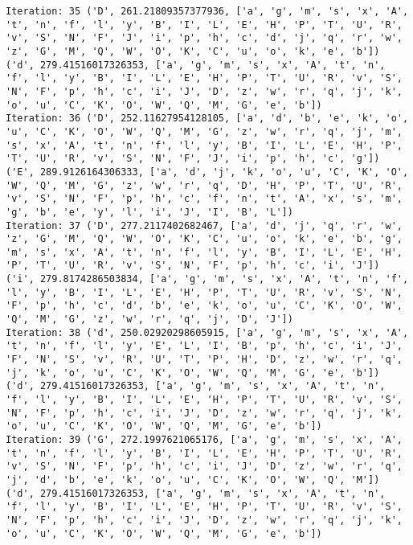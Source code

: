 \documentclass[english,man]{apa6}
\begin{document}
\begin{verbatim}
Iteration: 35 ('D', 261.21809357377936, ['a', 'g', 'm', 's', 'x', 'A', 't', 'n', 'f', 'l', 'y', 'B', 'I', 'L', 'E', 'H', 'P', 'T', 'U', 'R', 'v', 'S', 'N', 'F', 'J', 'i', 'p', 'h', 'c', 'd', 'j', 'q', 'r', 'w', 'z', 'G', 'M', 'Q', 'W', 'O', 'K', 'C', 'u', 'o', 'k', 'e', 'b']) ('d', 279.41516017326353, ['a', 'g', 'm', 's', 'x', 'A', 't', 'n', 'f', 'l', 'y', 'B', 'I', 'L', 'E', 'H', 'P', 'T', 'U', 'R', 'v', 'S', 'N', 'F', 'p', 'h', 'c', 'i', 'J', 'D', 'z', 'w', 'r', 'q', 'j', 'k', 'o', 'u', 'C', 'K', 'O', 'W', 'Q', 'M', 'G', 'e', 'b'])
Iteration: 36 ('D', 252.11627954128105, ['a', 'd', 'b', 'e', 'k', 'o', 'u', 'C', 'K', 'O', 'W', 'Q', 'M', 'G', 'z', 'w', 'r', 'q', 'j', 'm', 's', 'x', 'A', 't', 'n', 'f', 'l', 'y', 'B', 'I', 'L', 'E', 'H', 'P', 'T', 'U', 'R', 'v', 'S', 'N', 'F', 'J', 'i', 'p', 'h', 'c', 'g']) ('E', 289.9126164306333, ['a', 'd', 'j', 'k', 'o', 'u', 'C', 'K', 'O', 'W', 'Q', 'M', 'G', 'z', 'w', 'r', 'q', 'D', 'H', 'P', 'T', 'U', 'R', 'v', 'S', 'N', 'F', 'p', 'h', 'c', 'f', 'n', 't', 'A', 'x', 's', 'm', 'g', 'b', 'e', 'y', 'l', 'i', 'J', 'I', 'B', 'L'])
Iteration: 37 ('D', 277.2117402682467, ['a', 'd', 'j', 'q', 'r', 'w', 'z', 'G', 'M', 'Q', 'W', 'O', 'K', 'C', 'u', 'o', 'k', 'e', 'b', 'g', 'm', 's', 'x', 'A', 't', 'n', 'f', 'l', 'y', 'B', 'I', 'L', 'E', 'H', 'P', 'T', 'U', 'R', 'v', 'S', 'N', 'F', 'p', 'h', 'c', 'i', 'J']) ('i', 279.8174286503834, ['a', 'g', 'm', 's', 'x', 'A', 't', 'n', 'f', 'l', 'y', 'B', 'I', 'L', 'E', 'H', 'P', 'T', 'U', 'R', 'v', 'S', 'N', 'F', 'p', 'h', 'c', 'd', 'b', 'e', 'k', 'o', 'u', 'C', 'K', 'O', 'W', 'Q', 'M', 'G', 'z', 'w', 'r', 'q', 'j', 'D', 'J'])
Iteration: 38 ('d', 250.02920298605915, ['a', 'g', 'm', 's', 'x', 'A', 't', 'n', 'f', 'l', 'y', 'E', 'L', 'I', 'B', 'p', 'h', 'c', 'i', 'J', 'F', 'N', 'S', 'v', 'R', 'U', 'T', 'P', 'H', 'D', 'z', 'w', 'r', 'q', 'j', 'k', 'o', 'u', 'C', 'K', 'O', 'W', 'Q', 'M', 'G', 'e', 'b']) ('d', 279.41516017326353, ['a', 'g', 'm', 's', 'x', 'A', 't', 'n', 'f', 'l', 'y', 'B', 'I', 'L', 'E', 'H', 'P', 'T', 'U', 'R', 'v', 'S', 'N', 'F', 'p', 'h', 'c', 'i', 'J', 'D', 'z', 'w', 'r', 'q', 'j', 'k', 'o', 'u', 'C', 'K', 'O', 'W', 'Q', 'M', 'G', 'e', 'b'])
Iteration: 39 ('G', 272.1997621065176, ['a', 'g', 'm', 's', 'x', 'A', 't', 'n', 'f', 'l', 'y', 'B', 'I', 'L', 'E', 'H', 'P', 'T', 'U', 'R', 'v', 'S', 'N', 'F', 'p', 'h', 'c', 'i', 'J', 'D', 'z', 'w', 'r', 'q', 'j', 'd', 'b', 'e', 'k', 'o', 'u', 'C', 'K', 'O', 'W', 'Q', 'M']) ('d', 279.41516017326353, ['a', 'g', 'm', 's', 'x', 'A', 't', 'n', 'f', 'l', 'y', 'B', 'I', 'L', 'E', 'H', 'P', 'T', 'U', 'R', 'v', 'S', 'N', 'F', 'p', 'h', 'c', 'i', 'J', 'D', 'z', 'w', 'r', 'q', 'j', 'k', 'o', 'u', 'C', 'K', 'O', 'W', 'Q', 'M', 'G', 'e', 'b'])

\end{verbatim}
\end{document}
